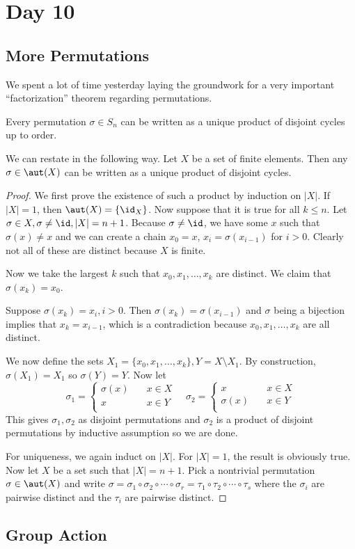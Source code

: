 \section{Day 10}

\subsection{More Permutations}
We spent a lot of time yesterday laying the groundwork for a very
important ``factorization'' theorem regarding permutations.

\begin{thm}
Every permutation $\sigma \in S_n$ can be written as a unique product of
disjoint cycles up to order.

We can restate in the following way. Let $X$ be a set of finite
elements. Then any $\sigma \in \aut(X)$ can be written as a unique
product of disjoint cycles.
\end{thm}

\begin{proof}
We first prove the existence of such a product by induction on $|X|$. If
$|X| = 1$, then $\aut(X) = \lbrace \id_X \rbrace$. Now suppose that it
is true for all $k \leq n$. Let $\sigma \in X, \sigma \neq \id, |X| = n
+ 1$.  Because $\sigma \neq \id$, we have some $x$ such that $\sigma(x)
\neq x$ and we can create a chain $x_0 = x$, $x_i = \sigma(x_{i - 1})$
for $i > 0$. Clearly not all of these are distinct because $X$ is
finite.

Now we take the largest $k$ such that $x_0, x_1, \dots, x_k$ are
distinct. We claim that $\sigma(x_k) = x_0$.

Suppose $\sigma(x_k) = x_i, i > 0$. Then $\sigma(x_k) = \sigma(x_{i -
1})$ and $\sigma$ being a bijection implies that $x_k = x_{i - 1}$,
which is a contradiction because $x_0, x_1, \dots, x_k$ are all
distinct.

We now define the sets $X_1 = \lbrace x_0, x_1, \dots, x_k \rbrace, Y =
X \setminus X_1$. By construction, $\sigma(X_1) = X_1$ so $\sigma(Y) =
Y$. Now let
\[ \sigma_1 = \left\lbrace\begin{aligned}
\sigma(x) &\quad x \in X \\
x &\quad x \in Y \\
\end{aligned}\right. \quad \sigma_2 = \left\lbrace\begin{aligned}
x &\quad x \in X \\
\sigma(x) &\quad x \in Y \\
\end{aligned}\right. \]
This gives $\sigma_1, \sigma_2$ as disjoint permutations and $\sigma_2$
is a product of disjoint permutations by inductive assumption so we are
done.

For uniqueness, we again induct on $|X|$. For $|X| = 1$, the result is
obviously true. Now let $X$ be a set such that $|X| = n + 1$. Pick a
nontrivial permutation $\sigma \in \aut(X)$ and write $\sigma = \sigma_1
\circ \sigma_2 \circ \cdots \circ \sigma_r = \tau_1 \circ \tau_2 \circ
\cdots \circ \tau_s$ where the $\sigma_i$ are pairwise distinct and the
$\tau_i$ are pairwise distinct.
\end{proof}

\subsection{Group Action}
